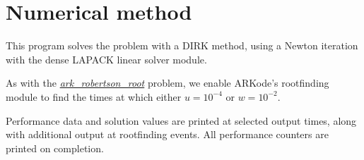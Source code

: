 \documentclass[letterpaper,10pt,english]{sphinxmanual}
\begin{document}
\section{Numerical method}
\label{fark_roberts_dnsL:numerical-method}
This program solves the problem with a DIRK method, using a Newton
iteration with the dense LAPACK linear solver module.

As with the {\hyperref[ark_robertson_root:ark-robertson-root]{\emph{ark\_robertson\_root}}} problem, we enable ARKode's
rootfinding module to find the times at which
either $u=10^{-4}$ or $w=10^{-2}$.

Performance data and solution values are printed at
selected output times, along with additional output at rootfinding
events.  All performance counters are printed on completion.



\renewcommand{\indexname}{Index}
\printindex
\end{document}
